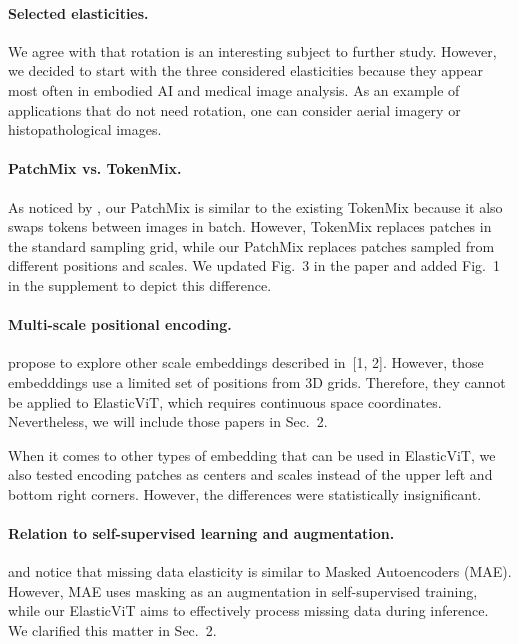 \documentclass[10pt,twocolumn,letterpaper]{article}
\begin{document}
\paragraph{Selected elasticities.}
We agree with \Rthree{} that rotation is an interesting subject to further study. However, we decided to start with the three considered elasticities because they appear most often in embodied AI and medical image analysis. As an example of applications that do not need rotation, one can consider aerial imagery or histopathological images.

\vspace{-0.05in}
\paragraph{PatchMix vs. TokenMix.}
As noticed by \Rone{}, our PatchMix is similar to the existing TokenMix because it also swaps tokens between images in batch. However, TokenMix replaces patches in the standard sampling grid, while our PatchMix replaces patches sampled from different positions and scales. We updated Fig.~3 in the paper and added Fig.~1 in the supplement to depict this difference.

\vspace{-0.05in}
\paragraph{Multi-scale positional encoding.}
\Rone{} propose to explore other scale embeddings described in~[1, 2]. However, those embedddings use a limited set of positions from 3D grids. Therefore, they cannot be applied to ElasticViT, which requires continuous space coordinates. Nevertheless, we will include those papers in Sec.~2.

When it comes to other types of embedding that can be used in ElasticViT, we also tested encoding patches as centers and scales instead of the upper left and bottom right corners. However, the differences were statistically insignificant.

\vspace{-0.05in}
\paragraph{Relation to self-supervised learning and augmentation.}
\Rone{} and \Rthree{} notice that missing data elasticity is similar to Masked Autoencoders (MAE). However, MAE uses masking as an augmentation in self-supervised training, while our ElasticViT aims to effectively process missing data during inference. We clarified this matter in Sec.~2.
\end{document}

